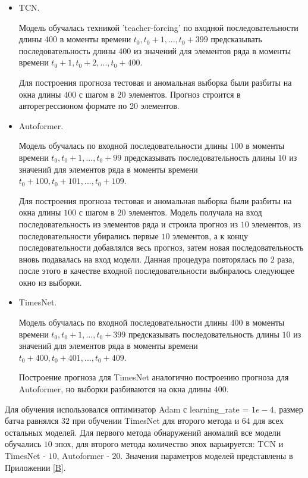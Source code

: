 \documentclass{article}
\begin{document}
\begin{itemize}
\item TCN.

Модель обучалась техникой 'teacher-forcing' по входной последовательности длины $400$ в моменты времени $t_0, t_0 + 1, ..., t_0 + 399$ предсказывать последовательность длины $400$ из значений для элементов ряда в моменты времени $t_0 + 1, t_0 + 2, ..., t_0 + 400$.

Для построения прогноза тестовая и аномальная выборка были разбиты на окна длины $400$ с шагом в $20$ элементов. Прогноз строится в авторегрессионом формате по 20 элементов.

\item Autoformer.

Модель обучалась по входной последовательности длины $100$ в моменты времени $t_0, t_0 + 1, ..., t_0 + 99$ предсказывать последовательность длины $10$ из значений для элементов ряда в моменты времени $t_0 + 100, t_0 + 101, ..., t_0 + 109$.

Для построения прогноза тестовая и аномальная выборка были разбиты на окна длины $100$ с шагом в $20$ элементов. Модель получала на вход последовательность из элементов ряда и строила прогноз из $10$ элементов, из последовательности убирались первые $10$ элементов, а к концу последовательности добавлялся весь прогноз, затем новая последовательность вновь подавалась на вход модели. Данная процедура повторялась по $2$ раза, после этого в качестве входной последовательности выбиралось следующее окно из выборки.

\item TimesNet.

Модель обучалась по входной последовательности длины $400$ в моменты времени $t_0, t_0 + 1, ..., t_0 + 399$ предсказывать последовательность длины $10$ из значений для элементов ряда в моменты времени $t_0 + 400, t_0 + 401 , ..., t_0 + 409$.

Построение прогноза для TimesNet аналогично построению прогноза для Autoformer, но выборки разбиваются на окна длины $400$. 
\end{itemize}

Для обучения использовался оптимизатор Adam с learning\_rate = $1e-4$, размер батча равнялся $32$ при обучении TimesNet для второго метода и $64$ для всех остальных моделей. Для первого метода обнаружений аномалий все модели обучались $10$ эпох, для второго метода количество эпох варьируется: TCN и TimesNet - $10$, Autoformer - $20$. Значения параметров моделей представлены в Приложении \ref{B}.
\end{document}
